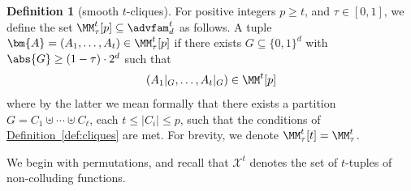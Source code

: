 \documentclass[11pt]{article}
\numberwithin{equation}{section}
\theoremstyle{definition}
\newtheorem{definition}[theorem]{Definition}
\theoremstyle{plain}
\newcommand{\expref}[2]{\hyperref[#2]{#1~\ref{#2}}}
\begin{document}
\begin{definition}[smooth $t$-cliques]\label{def:smooth inv}
	For positive integers $p \ge t$, and $\tau \in [0,1]$, we define the 
	set $\MM_\tau^t[p] \subseteq \advfam_d^t$ as follows. A tuple $
	\bm{A} =(A_1,\ldots,A_t) \in \MM_\tau^t[p]$ if there exists $G 
	\subseteq \{0,1\}^d$ with $\abs{G} \geq (1-\tau)\cdot2^d$ such that 
\[
\left( A_1|_G,\ldots,A_t|_G \right) \in \MM^t[p]
\]
where by the latter we mean formally that there exists a partition $G = C_1 \uplus \cdots \uplus C_\ell$, each $t \le |C_i| \le p$, such that
the conditions of \expref{Definition}{def:cliques} are met. For brevity, we denote $\MM_{\tau}^t[t] = \MM_\tau^t$.
%
\end{definition}

We begin with permutations, and recall that $\mathcal{X}^{t}$ denotes the set of $t$-tuples of non-colluding functions.
\end{document}
